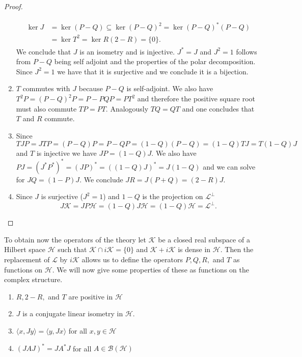\begin{proof}
\begin{enumerate}
\begin{align}
\begin{split}
\ker J&=\ker (P-Q)\subseteq\ker(P-Q)^2=\ker(P-Q)^*(P-Q) \\
&=\ker T^2=\ker R(2-R)=\{0\}.
\end{split}
\end{align}
We conclude that $J$ is an isometry and is injective. $J^*=J$ and $J^2=1$ follows from $P-Q$ being self adjoint and the properties of the polar decomposition. Since $J^2=1$ we have that it is surjective and we conclude it is a bijection.
\item $T$ commutes with $J$ because $P-Q$ is self-adjoint. We also have $T^2P=(P-Q)^2P=P-PQP=PT^2$ and therefore the positive square root must also commute $TP=PT$. Analogously $TQ=QT$ and one concludes that $T$ and $R$ commute.
\item Since $TJP=JTP=(P-Q)P=P-QP=(1-Q)(P-Q)=(1-Q)TJ=T(1-Q)J$ and $T$ is injective we have $JP=(1-Q)J$. We also have $PJ=(J^*P^*)^*=(JP)^*=((1-Q)J)^*=J(1-Q)$ and we can solve for $JQ=(1-P)J$. We conclude $JR=J(P+Q)=(2-R)J.$
\item Since $J$ is surjective ($J^2=1$) and $1-Q$ is the projection on $\mathcal{L}^\bot$ 
\begin{equation}
J\mathcal{K}=JP\mathcal{H}=(1-Q)J\mathcal{H}=(1-Q)\mathcal{H}=\mathcal{L}^\bot.
\end{equation}
\end{enumerate}
\end{proof}

To obtain now the operators of the theory let $\mathcal{K}$ be a closed real subspace of a Hilbert space $\mathcal{H}$ such that $\mathcal{K}\cap i\mathcal{K}=\{0\}$ and $\mathcal{K}+i\mathcal{K}$ is dense in $\mathcal{H}$. Then the replacement of $\mathcal{L}$ by $i\mathcal{K}$ allows us to define the operators $P,Q,R,$ and $T$ as functions on $\mathcal{H}$. We will now give some properties of these as functions on the complex structure.  

\begin{theorem}
\begin{enumerate}
\item $R,2-R,$ and $T$ are positive in $\mathcal{H}$
\item $J$ is a conjugate linear isometry in $\mathcal{H}$.
\item $\langle x, Jy\rangle=\langle y, Jx\rangle$ for all $x,y\in\mathcal{H}$ 
\item $(JAJ)^*=JA^*J$ for all $A\in\mathcal{B}(\mathcal{H})$
\end{enumerate}
\end{theorem}


